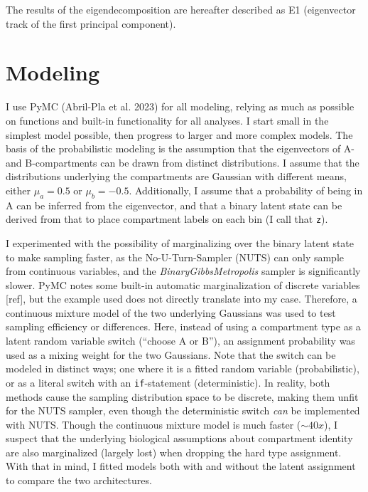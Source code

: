 \documentclass[
  10pt,
  a4paper,
  openany]{scrbook}
\begin{document}
The results of the eigendecomposition are hereafter described as E1
(eigenvector track of the first principal component).

\section{Modeling}\label{modeling}

I use PyMC (Abril-Pla et al. 2023) for all modeling, relying as much as
possible on functions and built-in functionality for all analyses. I
start small in the simplest model possible, then progress to larger and
more complex models. The basis of the probabilistic modeling is the
assumption that the eigenvectors of A- and B-compartments can be drawn
from distinct distributions. I assume that the distributions underlying
the compartments are Gaussian with different means, either
\(\mu_a = 0.5\) or \(\mu_b = -0.5\). Additionally, I assume that a
probability of being in A can be inferred from the eigenvector, and that
a binary latent state can be derived from that to place compartment
labels on each bin (I call that \texttt{z}).

I experimented with the possibility of marginalizing over the binary
latent state to make sampling faster, as the No-U-Turn-Sampler (NUTS)
can only sample from continuous variables, and the
\emph{BinaryGibbsMetropolis} sampler is significantly slower. PyMC notes
some built-in automatic marginalization of discrete variables {[}ref{]},
but the example used does not directly translate into my case.
Therefore, a continuous mixture model of the two underlying Gaussians
was used to test sampling efficiency or differences. Here, instead of
using a compartment type as a latent random variable switch (``choose A
or B''), an assignment probability was used as a mixing weight for the
two Gaussians. Note that the switch can be modeled in distinct ways; one
where it is a fitted random variable (probabilistic), or as a literal
switch with an \texttt{if}-statement (deterministic). In reality, both
methods cause the sampling distribution space to be discrete, making
them unfit for the NUTS sampler, even though the deterministic switch
\emph{can} be implemented with NUTS. Though the continuous mixture model
is much faster (\(\sim\!40x\)), I suspect that the underlying biological
assumptions about compartment identity are also marginalized (largely
lost) when dropping the hard type assignment. With that in mind, I
fitted models both with and without the latent assignment to compare the
two architectures.
\end{document}
